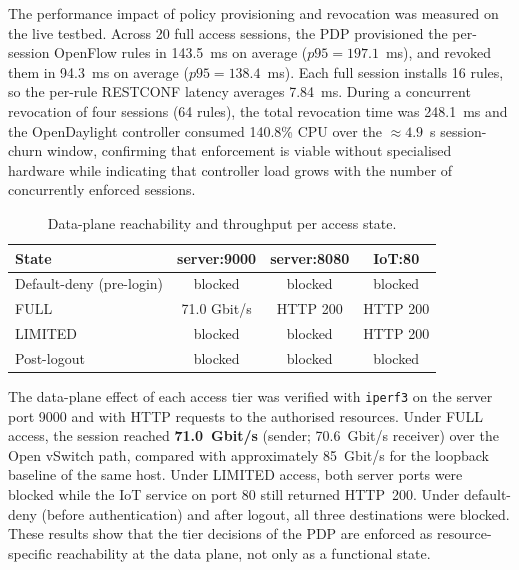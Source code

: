 The performance impact of policy provisioning and revocation was measured on
the live testbed. Across 20 full access sessions, the PDP provisioned the
per-session OpenFlow rules in 143.5~ms on average ($p95 = 197.1$~ms), and
revoked them in 94.3~ms on average ($p95 = 138.4$~ms). Each full session
installs 16 rules, so the per-rule RESTCONF latency averages 7.84~ms. During a
concurrent revocation of four sessions (64 rules), the total revocation time
was 248.1~ms and the OpenDaylight controller consumed 140.8\% CPU over the
$\approx 4.9$~s session-churn window, confirming that enforcement is viable
without specialised hardware while indicating that controller load grows with
the number of concurrently enforced sessions.


\begin{table}[t]
  \caption{Data-plane reachability and throughput per access state.}
  \label{tab:throughput}
  \centering
  \begin{tabular}{lccc}
    \hline
    \textbf{State} & \textbf{server:9000} & \textbf{server:8080} & \textbf{IoT:80} \\
    \hline
    Default-deny (pre-login) & blocked & blocked & blocked \\
    FULL                     & 71.0 Gbit/s & HTTP 200 & HTTP 200 \\
    LIMITED                  & blocked & blocked & HTTP 200 \\
    Post-logout              & blocked & blocked & blocked \\
    \hline
  \end{tabular}
\end{table}

The data-plane effect of each access tier was verified with \texttt{iperf3} on
the server port 9000 and with HTTP requests to the authorised resources. Under
FULL access, the session reached \textbf{71.0~Gbit/s} (sender; 70.6~Gbit/s
receiver) over the Open vSwitch path, compared with approximately 85~Gbit/s for
the loopback baseline of the same host. Under LIMITED access, both server ports
were blocked while the IoT service on port 80 still returned HTTP~200. Under
default-deny (before authentication) and after logout, all three destinations
were blocked. These results show that the tier decisions of the PDP are enforced
as resource-specific reachability at the data plane, not only as a functional
state.


